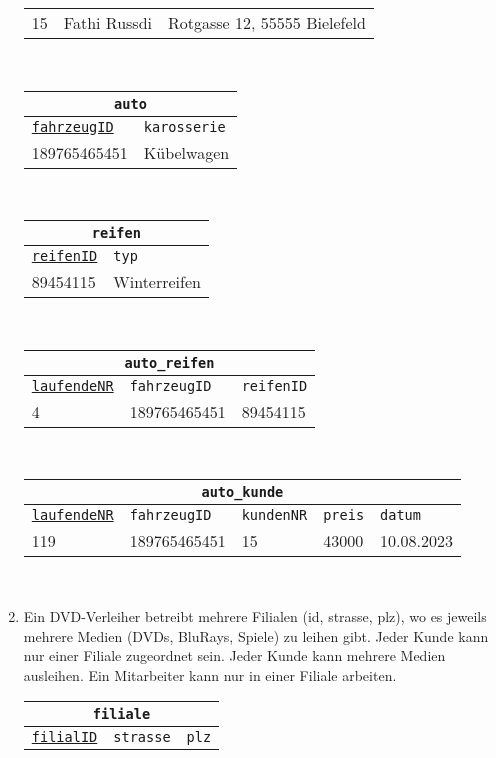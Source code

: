 \begin{Answer}[ref=TabelleErstellen1]
\begin{enumerate}
\begin{tabular}{lll}
			\hline
			15&Fathi Russdi&Rotgasse 12, 55555 Bielefeld\\
		\end{tabular}\\
		\begin{tabular}{ll}
			\multicolumn{2}{c}{\lstinline!auto!}\\
			\hline
			\underline{\lstinline!fahrzeugID!}&\lstinline!karosserie!\\
			\hline
			189765465451&Kübelwagen\\
		\end{tabular}\\
		\begin{tabular}{ll}
			\multicolumn{2}{c}{\lstinline!reifen!}\\
			\hline
			\underline{\lstinline!reifenID!}&\lstinline!typ!\\
			\hline
			89454115&Winterreifen\\
		\end{tabular}\\
		\begin{tabular}{lll}
			\multicolumn{3}{c}{\lstinline!auto_reifen!}\\
			\hline
			\underline{\lstinline!laufendeNR!}&\lstinline!fahrzeugID!&\lstinline!reifenID!\\
			\hline
			4&189765465451&89454115\\
		\end{tabular}\\
		\begin{tabular}{lllll}
			\multicolumn{5}{c}{\lstinline!auto_kunde!}\\
			\hline
			\underline{\lstinline!laufendeNR!}&\lstinline!fahrzeugID!&\lstinline!kundenNR!&\lstinline!preis!&\lstinline!datum!\\
			\hline
			119&189765465451&15&43000&10.08.2023\\
		\end{tabular}\\
		\item Ein DVD-Verleiher betreibt mehrere Filialen (id, strasse, plz), wo es jeweils mehrere Medien (DVDs, BluRays, Spiele) zu leihen gibt. Jeder Kunde kann nur einer Filiale zugeordnet sein. Jeder Kunde kann mehrere Medien ausleihen. Ein Mitarbeiter kann nur in einer Filiale arbeiten.\\
		\begin{tabular}{lll}
			\multicolumn{3}{c}{\lstinline!filiale!}\\
			\hline
			\underline{\lstinline!filialID!}&\lstinline!strasse!&\lstinline!plz!\\

\end{tabular}
\end{enumerate}
\end{Answer}
